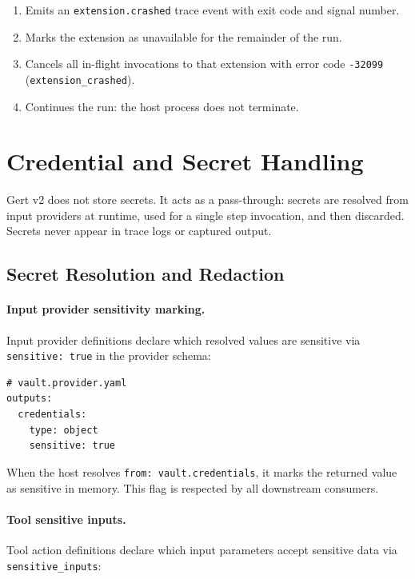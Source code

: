 \begin{enumerate}
  \item Emits an \texttt{extension.crashed} trace event with exit code and
        signal number.
  \item Marks the extension as unavailable for the remainder of the run.
  \item Cancels all in-flight invocations to that extension with error code
        \texttt{-32099} (\texttt{extension\_crashed}).
  \item Continues the run: the host process does not terminate.
\end{enumerate}

\section{Credential and Secret Handling}
\label{sec:credential-handling}

Gert v2 does not store secrets.  It acts as a pass-through: secrets are
resolved from input providers at runtime, used for a single step invocation,
and then discarded.  Secrets never appear in trace logs or captured output.

\subsection{Secret Resolution and Redaction}

\paragraph{Input provider sensitivity marking.}
Input provider definitions declare which resolved values are sensitive via
\texttt{sensitive: true} in the provider schema:

\begin{verbatim}
# vault.provider.yaml
outputs:
  credentials:
    type: object
    sensitive: true
\end{verbatim}

When the host resolves \texttt{from: vault.credentials}, it marks the returned
value as sensitive in memory.  This flag is respected by all downstream
consumers.

\paragraph{Tool sensitive inputs.}
Tool action definitions declare which input parameters accept sensitive data via
\texttt{sensitive\_inputs}:

